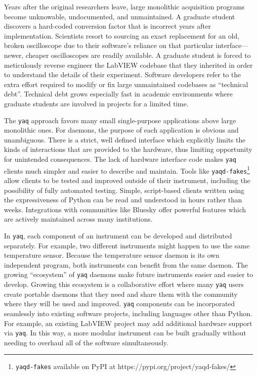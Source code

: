 \documentclass[aip, amsmath, amssymb, reprint,]{revtex4-2}
\newcommand\yaq{\texttt{yaq}}
\begin{document}
Years after the original researchers leave, large monolithic acquisition programs become unknowable, undocumented, and unmaintained.
A graduate student discovers a hard-coded conversion factor that is incorrect years after implementation.
Scientists resort to sourcing an exact replacement for an old, broken oscilloscope due to their software's reliance on that particular interface---newer, cheaper oscilloscopes are readily available.
A graduate student is forced to meticulously reverse engineer the LabVIEW codebase that they inherited in order to understand the details of their experiment.
Software developers refer to the extra effort required to modify or fix large unmaintained codebases as ``technical debt''.\cite{Allman_2012}
Technical debt grows especially fast in academic environments where graduate students are involved in projects for a limited time.

The \yaq{} approach favors many small single-purpose applications above large monolithic ones.
For daemons, the purpose of each application is obvious and unambiguous.
There is a strict, well defined interface which explicitly limits the kinds of interactions that are provided to the hardware, thus limiting opportunity for unintended consequences.
The lack of hardware interface code makes \yaq{} clients much simpler and easier to describe and maintain.
Tools like \texttt{yaqd-fakes}\footnote{\texttt{yaqd-fakes} available on PyPI at https://pypi.org/project/yaqd-fakes/} allow clients to be tested and improved outside of their instrument, including the possibility of fully automated testing.
Simple, script-based clients written using the expressiveness of Python can be read and understood in hours rather than weeks.
Integrations with communities like Bluesky offer powerful features which are actively maintained across many institutions.

In \yaq{}, each component of an instrument can be developed and distributed separately.
For example, two different instruments might happen to use the same temperature sensor.
Because the temperature sensor daemon is its own independent program, both instruments can benefit from the same daemon.
The growing ``ecosystem'' of \yaq{} daemons make future instruments easier and easier to develop.
Growing this ecosystem is a collaborative effort where many \yaq{} users create portable daemons that they need and share them with the community where they will be used and improved.
\yaq{} components can be incorporated seamlessly into existing software projects, including languages other than Python.
For example, an existing LabVIEW project may add additional hardware support via \yaq{}.
In this way, a more modular instrument can be built gradually without needing to overhaul all of the software simultaneously.
\end{document}

